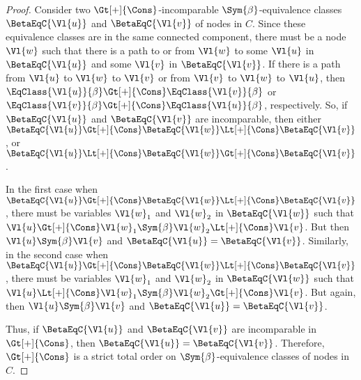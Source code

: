 \begin{proof}
    Consider two $\Gt[+]{\Cons}$-incomparable $\Sym{\beta}$-equivalence classes
    $\BetaEqC{\Vl{u}}$ and $\BetaEqC{\Vl{v}}$ of nodes in $C$. Since these
    equivalence classes are in the same connected component, there must be a
    node $\Vl{w}$ such that there is a path to or from $\Vl{w}$ to some
    $\Vl{u}$ in $\BetaEqC{\Vl{u}}$ and some $\Vl{v}$ in $\BetaEqC{\Vl{v}}$. If
    there is a path from $\Vl{u}$ to $\Vl{w}$ to $\Vl{v}$ or from $\Vl{v}$ to
    $\Vl{w}$ to $\Vl{u}$, then $\EqClass{\Vl{u}}{\beta} \Gt[+]{\Cons}
    \EqClass{\Vl{v}}{\beta}$ or $\EqClass{\Vl{v}}{\beta} \Gt[+]{\Cons}
    \EqClass{\Vl{u}}{\beta}$, respectively. So, if $\BetaEqC{\Vl{u}}$ and
    $\BetaEqC{\Vl{v}}$ are incomparable, then either $\BetaEqC{\Vl{u}}
    \Gt[+]{\Cons} \BetaEqC{\Vl{w}} \Lt[+]{\Cons} \BetaEqC{\Vl{v}}$, or
    $\BetaEqC{\Vl{u}} \Lt[+]{\Cons} \BetaEqC{\Vl{w}} \Gt[+]{\Cons}
    \BetaEqC{\Vl{v}}$.

    In the first case when $\BetaEqC{\Vl{u}} \Gt[+]{\Cons} \BetaEqC{\Vl{w}}
    \Lt[+]{\Cons} \BetaEqC{\Vl{v}}$, there must be variables $\Vl{w}_1$ and
    $\Vl{w}_2$ in $\BetaEqC{\Vl{w}}$ such that $\Vl{u} \Gt[+]{\Cons} \Vl{w}_1
    \Sym{\beta} \Vl{w}_2 \Lt[+]{\Cons} \Vl{v}$. But then $\Vl{u} \Sym{\beta}
    \Vl{v}$ and $\BetaEqC{\Vl{u}} = \BetaEqC{\Vl{v}}$. Similarly, in the second
    case when $\BetaEqC{\Vl{u}} \Gt[+]{\Cons} \BetaEqC{\Vl{w}} \Lt[+]{\Cons}
    \BetaEqC{\Vl{v}}$, there must be variables $\Vl{w}_1$ and $\Vl{w}_2$ in
    $\BetaEqC{\Vl{w}}$ such that $\Vl{u} \Lt[+]{\Cons} \Vl{w}_1 \Sym{\beta}
    \Vl{w}_2 \Gt[+]{\Cons} \Vl{v}$. But again, then $\Vl{u} \Sym{\beta} \Vl{v}$
    and $\BetaEqC{\Vl{u}} = \BetaEqC{\Vl{v}}$.

    Thus, if $\BetaEqC{\Vl{u}}$ and $\BetaEqC{\Vl{v}}$ are incomparable in
    $\Gt[+]{\Cons}$, then $\BetaEqC{\Vl{u}} = \BetaEqC{\Vl{v}}$. Therefore,
    $\Gt[+]{\Cons}$ is a strict total order on $\Sym{\beta}$-equivalence
    classes of nodes in $C$. \end{proof}

